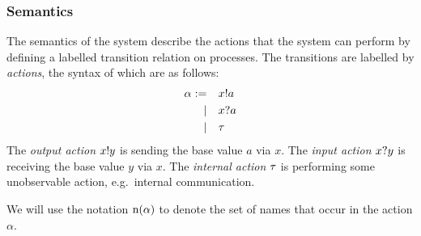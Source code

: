 


\subsubsection{Semantics}
The semantics of the system describe the actions that the system can perform by defining a labelled transition relation on processes.
The transitions are labelled by \emph{actions}, the syntax of which are as follows:
\begin{align*}
  \alpha := &&& x ! a \\
  |&&& x ? a \\
  |&&& \tau
\end{align*}
The \emph{output action} \( x ! y \) is sending the base value \( a \) via \( x \).
The \emph{input action} \( x ? y \) is receiving the base value \( y \) via \( x \).
The \emph{internal action} \( \tau \) is performing some unobservable action, e.g.\ internal communication.

We will use the notation \( \textrm{n}(\alpha) \) to denote the set of names that occur in the action \( \alpha \).

